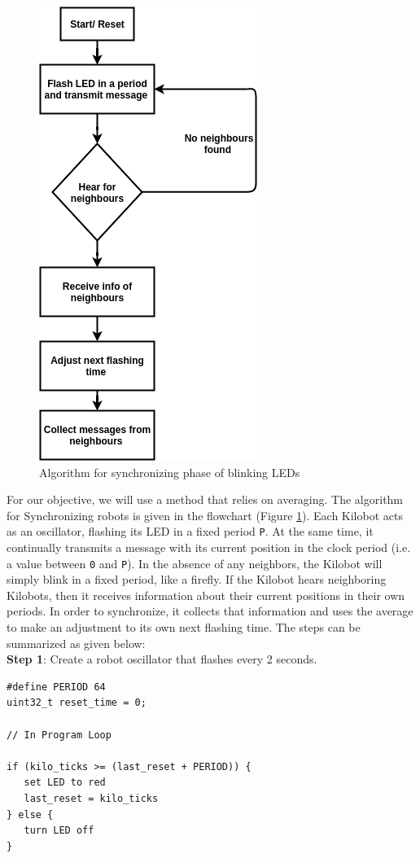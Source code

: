 \begin{figure}[H]
    \centering
	\includegraphics[scale=0.8]{images/sync-algo}
	\caption{Algorithm for synchronizing phase of blinking LEDs }
	\label{fig:sync}
\end{figure}

\noindent For our objective, we will use a method that relies on averaging. The algorithm for Synchronizing robots is given in the flowchart (Figure \ref{fig:sync}).  Each Kilobot acts as an oscillator, flashing its LED in a fixed period \texttt{P}.  At the same time, it continually transmits a message with its current position in the clock period (i.e. a value between \texttt{0} and \texttt{P}).  In the absence of any neighbors, the Kilobot will simply blink in a fixed period, like a firefly.  If the Kilobot hears neighboring Kilobots, then it receives information about their current positions in their own periods. In order to synchronize, it collects that information and uses the average to make an adjustment to its own next flashing time. The steps can be summarized as given below: \\ 

\noindent \textbf{Step 1}: Create a robot oscillator that flashes every 2 seconds.
\begin{verbatim}
#define PERIOD 64
uint32_t reset_time = 0;

// In Program Loop

if (kilo_ticks >= (last_reset + PERIOD)) {
   set LED to red
   last_reset = kilo_ticks
} else {
   turn LED off
}
\end{verbatim}

